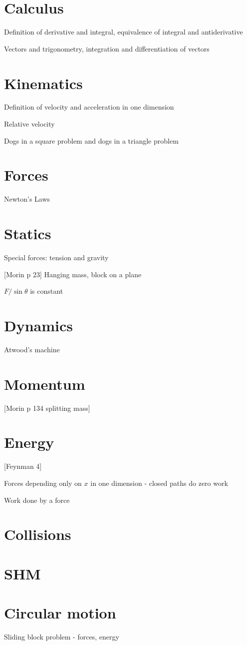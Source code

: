 \documentclass{article}
\title{}
\date{}
\newcommand{\<}{\langle}
\renewcommand{\>}{\rangle}
\begin{document}
\maketitle

\section{Calculus}

Definition of derivative and integral, equivalence of integral and antiderivative

Vectors and trigonometry, integration and differentiation of vectors

\section{Kinematics}

Definition of velocity and acceleration in one dimension

Relative velocity

Dogs in a square problem and dogs in a triangle problem

\section{Forces}

Newton's Laws

\section{Statics}

Special forces: tension and gravity

[Morin p 23] Hanging mass, block on a plane

$F/\sin\theta$ is constant

\section{Dynamics}

Atwood's machine

\section{Momentum}

[Morin p 134 splitting mass]

\section{Energy}

[Feynman 4]

Forces depending only on $x$ in one dimension - closed paths do zero work

Work done by a force

\section{Collisions}

\section{SHM}

\section{Circular motion}


Sliding block problem - forces, energy
\end{document}
